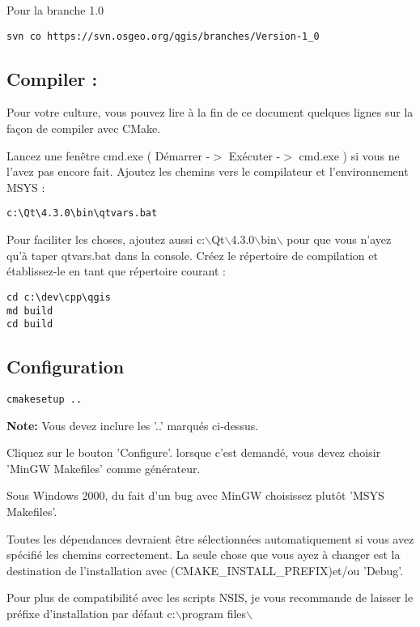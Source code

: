 Pour la branche 1.0

\begin{verbatim}
svn co https://svn.osgeo.org/qgis/branches/Version-1_0
\end{verbatim}

\subsection{Compiler :}
Pour votre culture, vous pouvez lire à la fin de ce document quelques lignes sur la façon de compiler avec CMake.

Lancez une fenêtre cmd.exe ( Démarrer -$>$ Exécuter -$>$ cmd.exe ) si vous ne l'avez pas encore fait. Ajoutez les chemins vers le compilateur et l'environnement MSYS :

\begin{verbatim}
c:\Qt\4.3.0\bin\qtvars.bat 
\end{verbatim}

Pour faciliter les choses, ajoutez aussi c:$\backslash$Qt$\backslash$4.3.0$\backslash$bin$\backslash$ pour que vous n'ayez qu'à taper qtvars.bat dans la console. Créez le répertoire de compilation et établissez-le en tant que répertoire courant :

\begin{verbatim}
cd c:\dev\cpp\qgis 
md build 
cd build 
\end{verbatim}

\subsection{Configuration}
\begin{verbatim}
cmakesetup ..  
\end{verbatim}

\textbf{Note:} Vous devez inclure les '..' marqués ci-dessus.

Cliquez sur le bouton 'Configure'.  lorsque c'est demandé, vous devez choisir 'MinGW Makefiles' comme générateur.

Sous Windows 2000, du fait d'un bug avec MinGW choisissez plutôt 'MSYS Makefiles'.

Toutes les dépendances devraient être sélectionnées automatiquement si vous avez spécifié les chemins correctement. La seule chose que vous ayez à changer est la destination de l'installation avec (CMAKE\_INSTALL\_PREFIX)et/ou 'Debug'.

Pour plus de compatibilité avec les scripts NSIS, je vous recommande de laisser le préfixe d'installation par défaut  c:$\backslash$program files$\backslash$

